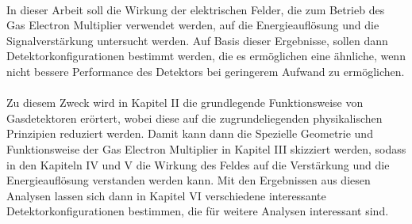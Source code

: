 \\
In dieser Arbeit soll die Wirkung der elektrischen Felder, die zum Betrieb des Gas Electron Multiplier verwendet werden, auf die Energieauflösung und die Signalverstärkung untersucht werden. Auf Basis dieser Ergebnisse, sollen dann Detektorkonfigurationen bestimmt werden, die es ermöglichen eine ähnliche, wenn nicht bessere Performance des Detektors bei geringerem Aufwand zu ermöglichen.\\
\\
Zu diesem Zweck wird in Kapitel II die grundlegende Funktionsweise von Gasdetektoren erörtert, wobei diese auf die zugrundeliegenden physikalischen Prinzipien reduziert werden. Damit kann dann die Spezielle Geometrie und Funktionsweise der Gas Electron Multiplier in Kapitel III skizziert werden, sodass in den Kapiteln IV und V die Wirkung des Feldes auf die Verstärkung und die Energieauflösung verstanden werden kann. Mit den Ergebnissen aus diesen Analysen lassen sich dann in Kapitel VI verschiedene interessante Detektorkonfigurationen bestimmen, die für weitere Analysen interessant sind. 
